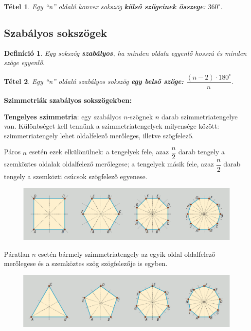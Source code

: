\documentclass[12pt,a4paper]{article}
\newtheorem{theorem}{Tétel} [section]
\newtheorem{definition}{Definíció} [section]
\begin{document}
\begin{theorem}
Egy ``n'' oldalú konvex sokszög \textbf{külső szögeinek összege}: $360^\circ$.
\end{theorem}

\subsection{Szabályos sokszögek}
\begin{definition}
Egy sokszög \textbf{szabályos}, ha minden oldala egyenlő hosszú és minden szöge egyenlő.
\end{definition}

\begin{theorem}
Egy ``n'' oldalú szabályos sokszög \textbf{egy belső szöge:} $\dfrac{(n-2)\cdot 180^\circ}{n}$.
\end{theorem}
\newpage
\textbf{Szimmetriák szabályos sokszögekben:}

\textbf{Tengelyes szimmetria}: egy szabályos $n$-szögnek $n$ darab szimmetriatengelye van. Különbséget kell tennünk a szimmetriatengelyek milyensége között: szimmetriatengely lehet oldalfelező merőleges, illetve szögfelező.

Páros $n$ esetén ezek elkülönülnek: a tengelyek fele, azaz $\dfrac{n}{2}$ darab tengely a szemköztes oldalak oldalfelező merőlegese; a tengelyek másik fele, azaz $\dfrac{n}{2}$ darab tengely a szemközti csúcsok szögfelező egyenese.

\begin{figure}[h]
\centering
\includegraphics[scale=0.3]{geometry/szimmetria1}
\end{figure}

Páratlan $n$ esetén bármely szimmetriatengely az egyik oldal oldalfelező merőlegese és a szemköztes szög szögfelezője is egyben.

\begin{figure}[h]
\centering
\includegraphics[scale=0.3]{geometry/szimmetria2}
\end{figure}
\end{document}
